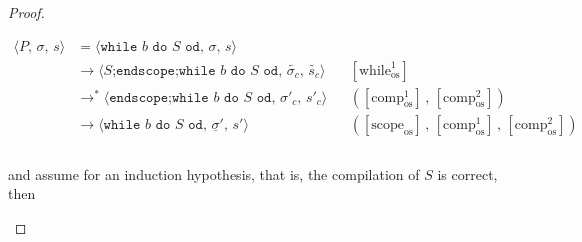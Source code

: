 \documentclass{article}
\begin{document}
\begin{proof}
\begin{itemize}
\begin{itemize}
          \[
              \begin{aligned}
              \langle P,\, \sigma,\, s \rangle
              &=\langle \texttt{while } b \texttt{ do } S \texttt{ od},\, \sigma,\, s \rangle \\
              &\rightarrow \langle S\texttt{;endscope} \texttt{;while } b \texttt{ do } S \texttt{ od},\, \tilde{\sigma_c},\, \tilde{s_c} \rangle
              && [\text{while}^1_{\text{os}}]   \\
              &\rightarrow^\ast \langle \texttt{endscope} \texttt{;while } b \texttt{ do } S \texttt{ od},\, \sigma'_c,\, s'_c \rangle
              && ([\text{comp}^1_{\text{os}}] \,,\, [\text{comp}^2_{\text{os}}])   \\
              &\rightarrow \langle \texttt{while } b \texttt{ do } S \texttt{ od},\, \underline{\sigma}',\, s' \rangle
              && ([\text{scope}_{\text{os}}] \,,\, [\text{comp}^1_{\text{os}}] \,,\, [\text{comp}^2_{\text{os}}])   \\
              &&    \\
              \end{aligned}
          \]

          and assume for an induction hypothesis, that is, the compilation of $S$ is correct, then


\end{itemize}
\end{itemize}
\end{proof}
\end{document}
